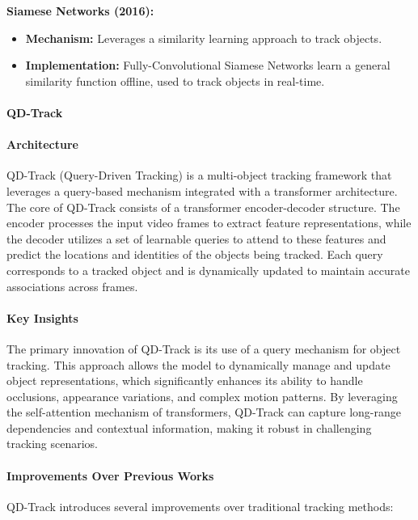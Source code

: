 \documentclass[12pt]{article}
\begin{document}
\textbf{Siamese Networks (2016):}
\begin{itemize}
    \item \textbf{Mechanism:} Leverages a similarity learning approach to track objects.
    \item \textbf{Implementation:} Fully-Convolutional Siamese Networks learn a general similarity function offline, used to track objects in real-time.
\end{itemize}

\paragraph{QD-Track}

\paragraph{Architecture}
QD-Track (Query-Driven Tracking) is a multi-object tracking framework that leverages a query-based mechanism integrated with a transformer architecture. The core of QD-Track consists of a transformer encoder-decoder structure. The encoder processes the input video frames to extract feature representations, while the decoder utilizes a set of learnable queries to attend to these features and predict the locations and identities of the objects being tracked. Each query corresponds to a tracked object and is dynamically updated to maintain accurate associations across frames.

\paragraph{Key Insights}
The primary innovation of QD-Track is its use of a query mechanism for object tracking. This approach allows the model to dynamically manage and update object representations, which significantly enhances its ability to handle occlusions, appearance variations, and complex motion patterns. By leveraging the self-attention mechanism of transformers, QD-Track can capture long-range dependencies and contextual information, making it robust in challenging tracking scenarios.

\paragraph{Improvements Over Previous Works}
QD-Track introduces several improvements over traditional tracking methods:
\end{document}
